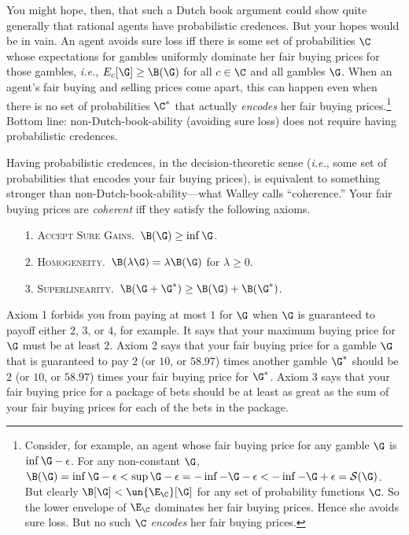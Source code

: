 You might hope, then, that such a Dutch book argument could show quite generally that rational agents have probabilistic credences. But your hopes would be in vain. An agent avoids sure loss iff there is some set of probabilities $\C$ whose expectations for gambles uniformly dominate her fair buying prices for those gambles, \textit{i.e.}, $E_c[\G]\geq\B(\G)$ for all $c\in\C$ and all gambles $\G$. When an agent's fair buying and selling prices come apart, this can happen even when there is no set of probabilities $\C^*$ that actually \textit{encodes} her fair buying prices.\footnote{Consider, for example, an agent whose fair buying price for any gamble $\G$ is $\inf\G-\epsilon$. For any non-constant $\G$, $\B(\G)=\inf\G-\epsilon<\sup\G-\epsilon=-\inf-\G-\epsilon<-\inf-\G+\epsilon=\mathcal{S}(\G)$. But clearly $\B[\G]<\un{\E_\C}[\G]$ for any set of probability functions $\C$. So the lower envelope of $\E_\C$ dominates her fair buying prices. Hence she avoids sure loss. But no such $\C$ \textit{encodes} her fair buying prices.} Bottom line: non-Dutch-book-ability (avoiding sure loss) does not require having probabilistic credences.

Having probabilistic credences, in the decision-theoretic sense (\textit{i.e.}, some set of probabilities that encodes your fair buying prices), is equivalent to something stronger than non-Dutch-book-ability---what Walley calls ``coherence.'' Your fair buying prices are \textit{coherent} iff they satisfy the following axioms.
\begin{enumerate}
\item[1.] \textsc{Accept Sure Gains.}\, $\B(\G)\geq \inf\G$.
\item[2.] \textsc{Homogeneity.}\, $\B(\lambda\G)=\lambda\B(\G)$ for $\lambda\geq0$.
\item[3.] \textsc{Superlinearity.}\, $\B(\G+\G^*)\geq\B(\G)+\B(\G^*)$.
\end{enumerate}
Axiom 1 forbids you from paying at most \textsterling$1$ for $\G$ when $\G$ is guaranteed to payoff either \textsterling$2$, \textsterling$3$, or \textsterling$4$, for example. It says that your maximum buying price for $\G$ must be at least \textsterling$2$. Axiom 2 says that your fair buying price for a gamble $\G$ that is guaranteed to pay $2$ (or $10$, or $58.97$) times another gamble $\G^*$ should be $2$ (or $10$, or $58.97$) times your fair buying price for $\G^*$. Axiom 3 says that your fair buying price for a package of bets should be at least as great as the sum of your fair buying prices for each of the bets in the package.

